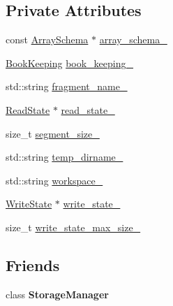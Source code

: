 \subsection*{Private Attributes}
\begin{DoxyCompactItemize}
\item 
const \hyperlink{classArraySchema}{Array\+Schema} $\ast$ \hyperlink{classStorageManager_1_1Fragment_ac4094cdea97450d1fe7e6c069aee4848}{array\+\_\+schema\+\_\+}
\item 
\hyperlink{structStorageManager_1_1BookKeeping}{Book\+Keeping} \hyperlink{classStorageManager_1_1Fragment_a42edffdedb68f6d9387b630e614a1a2b}{book\+\_\+keeping\+\_\+}
\item 
std\+::string \hyperlink{classStorageManager_1_1Fragment_a4d528ff02e38fd5c504103e743e9d394}{fragment\+\_\+name\+\_\+}
\item 
\hyperlink{structStorageManager_1_1ReadState}{Read\+State} $\ast$ \hyperlink{classStorageManager_1_1Fragment_a920650a1ba1e6923b387970d0b0919c9}{read\+\_\+state\+\_\+}
\item 
size\+\_\+t \hyperlink{classStorageManager_1_1Fragment_ac821268597048ee85e3b0f9a7ed134f2}{segment\+\_\+size\+\_\+}
\item 
std\+::string \hyperlink{classStorageManager_1_1Fragment_ac8440e27a50f5a2d05dcf227a92aa5ce}{temp\+\_\+dirname\+\_\+}
\item 
std\+::string \hyperlink{classStorageManager_1_1Fragment_a2bba52e89247da9f220083a40625cc85}{workspace\+\_\+}
\item 
\hyperlink{structStorageManager_1_1WriteState}{Write\+State} $\ast$ \hyperlink{classStorageManager_1_1Fragment_a575fde194ea2e0f1eaff4c939da801ff}{write\+\_\+state\+\_\+}
\item 
size\+\_\+t \hyperlink{classStorageManager_1_1Fragment_ae91602363a194e997a36ba34a709431c}{write\+\_\+state\+\_\+max\+\_\+size\+\_\+}
\end{DoxyCompactItemize}
\subsection*{Friends}
\begin{DoxyCompactItemize}
\item 
\hypertarget{classStorageManager_1_1Fragment_aab928c97ba2ed82b71fb011b1c4fef74}{}class {\bfseries Storage\+Manager}\label{classStorageManager_1_1Fragment_aab928c97ba2ed82b71fb011b1c4fef74}

\end{DoxyCompactItemize}


